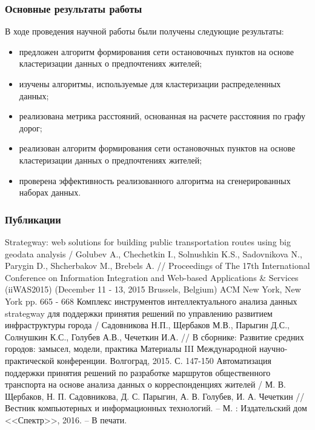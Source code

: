 \begin{frame}
    \frametitle{Основные результаты работы}
    В ходе проведения научной работы были получены следующие результаты:
    \begin{itemize}
        \item предложен алгоритм формирования сети остановочных пунктов на основе кластеризации данных о предпочтениях жителей;
        \item изучены алгоритмы, используемые для кластеризации распределенных данных;
        \item реализована метрика расстояний, основанная на расчете расстояния по графу дорог;
        \item реализован алгоритм формирования сети остановочных пунктов на основе кластеризации данных о предпочтениях жителей;
        \item проверена эффективность реализованного алгоритма на сгенерированных наборах данных.
    \end{itemize}
\end{frame}

\begin{frame}
    \frametitle{Публикации}
    \scriptsize
    \begin{thebibliography}{10}
         Strategway: web solutions for building public transportation routes using big geodata 
            analysis / Golubev A., Chechetkin I., Solnushkin K.S., Sadovnikova N., Parygin D., Shcherbakov M., 
            Brebels A. // Proceedings of The 17th International Conference on Information Integration and 
            Web-based Applications \& Services (iiWAS2015) (December 11 - 13, 2015 Brussels, Belgium) 
            ACM New York, New York pp. 665 - 668
         Комплекс инструментов интеллектуального анализа данных strategway для поддержки 
            принятия решений по управлению развитием инфраструктуры города / Садовникова Н.П., Щербаков М.В., 
            Парыгин Д.С., Солнушкин К.С., Голубев А.В., Чечеткин И.А. // В сборнике: Развитие средних 
            городов: замысел, модели, практика Материалы III Международной научно-практической конференции. 
            Волгоград, 2015. С. 147-150
         Автоматизация поддержки принятия решений по разработке маршрутов общественного 
            транспорта на основе анализа данных о корреспонденциях жителей / М. В. Щербаков, 
            Н. П. Садовникова, Д. С. Парыгин, А. В. Голубев, И. А. Чечеткин // Вестник компьютерных и 
            информационных технологий. -- М. : Издательский дом <<Спектр>>, 2016. -- В печати.
    \end{thebibliography}
\end{frame}

